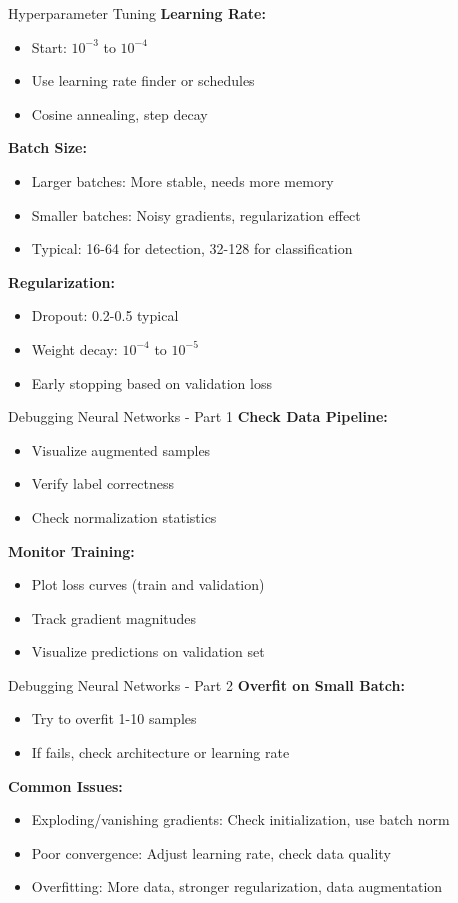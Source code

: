 \documentclass[aspectratio=169,10pt]{beamer}
\begin{document}
\begin{frame}{Hyperparameter Tuning}
\textbf{Learning Rate:}
\begin{itemize}
\item Start: $10^{-3}$ to $10^{-4}$
\item Use learning rate finder or schedules
\item Cosine annealing, step decay
\end{itemize}

\textbf{Batch Size:}
\begin{itemize}
\item Larger batches: More stable, needs more memory
\item Smaller batches: Noisy gradients, regularization effect
\item Typical: 16-64 for detection, 32-128 for classification
\end{itemize}

\textbf{Regularization:}
\begin{itemize}
\item Dropout: 0.2-0.5 typical
\item Weight decay: $10^{-4}$ to $10^{-5}$
\item Early stopping based on validation loss
\end{itemize}
\end{frame}

\begin{frame}{Debugging Neural Networks - Part 1}
\textbf{Check Data Pipeline:}
\begin{itemize}
\item Visualize augmented samples
\item Verify label correctness
\item Check normalization statistics
\end{itemize}

\textbf{Monitor Training:}
\begin{itemize}
\item Plot loss curves (train and validation)
\item Track gradient magnitudes
\item Visualize predictions on validation set
\end{itemize}
\end{frame}

\begin{frame}{Debugging Neural Networks - Part 2}
\textbf{Overfit on Small Batch:}
\begin{itemize}
\item Try to overfit 1-10 samples
\item If fails, check architecture or learning rate
\end{itemize}

\textbf{Common Issues:}
\begin{itemize}
\item Exploding/vanishing gradients: Check initialization, use batch norm
\item Poor convergence: Adjust learning rate, check data quality
\item Overfitting: More data, stronger regularization, data augmentation
\end{itemize}
\end{frame}
\end{document}
